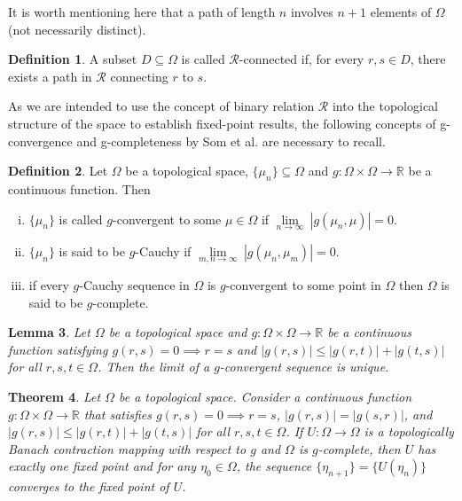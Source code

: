 \documentclass[10pt, reqno]{amsart}
\newtheorem{theorem}{Theorem}[section]
\newtheorem{lemma}[theorem]{Lemma}
\theoremstyle{definition}
\newtheorem{definition}[theorem]{Definition}
\theoremstyle{remark}
\numberwithin{equation}{section}
\begin{document}
It is worth mentioning here that a path of length $n$ involves $n+1$ elements of $ \Omega $ (not necessarily distinct). 

\begin{definition}\cite{alam0000relationfilomat} 
	A subset $D\subseteq \Omega $ is called $\mathcal{R}$-connected  if, for every $ r, s \in D $, there exists a path in $\mathcal{R}$  connecting $ r $ to $ s $. 
\end{definition}


As we are intended to  use the concept of binary relation $ \mathcal{R} $ into
the topological structure of the space to establish fixed-point results,   the following  concepts of g-convergence and g-completeness by Som et al. \cite{S.Som} are necessary to recall.

\begin{definition}\cite{S.Som}
     Let $ \Omega $ be a topological space,  $ \{ \mu_n\} \subseteq  \Omega $   and $ g : \Omega \times \Omega \to \mathbb{R} $ be a continuous function.   Then 
     \begin{enumerate} [(i)]
         \item $ \{ \mu_n\} $  is called $  g $-convergent to some  $ \mu \in \Omega $ if $ \underset{n\to \infty}{\lim} ~ | g ( \mu_n, \mu ) | = 0 $.
        \item $ \{\mu_n\} $  is said to be $  g $-Cauchy if $ \underset{m, n\to \infty}{\lim} ~ | g ( \mu_n, \mu_m ) | = 0 $.
        \item if every $  g $-Cauchy sequence   in  $ \Omega $  is $  g $-convergent to some  point  in  $ \Omega $ then $ \Omega $ is said to be $  g $-complete.
     \end{enumerate}
\end{definition}
 
\begin{lemma} \label{uniqueness of limit} \cite{S.Som}
	Let $ \Omega $ be a topological space and  $ g: \Omega \times \Omega \to\mathbb{R} $ be a continuous function     satisfying $ g ( r, s) = 0 \implies r = s $ and $ | g(r, s) | \leq | g(r, t) |+ | g(t, s) | $  for all $  r, s, t \in \Omega $.  Then the limit of a $ g $-convergent sequence is unique.
\end{lemma}

\begin{theorem} \cite{S.Som}  \label{thm of S.Som} 
Let $ \Omega $ be a  topological space. Consider a continuous function   $ g : \Omega \times \Omega \to \mathbb{R} $    that satisfies $ g(r, s) = 0 \implies r = s $, $ |g(r, s)| = |g( s, r )| $, and $ |g( r, s )| \leq |g(r, t )| + |g(t, s)| $ for all $ r, s, t \in \Omega $. If $ U : \Omega \to \Omega $ is a topologically Banach contraction mapping with respect to $ g $ and $ \Omega $ is $ g $-complete, then $ U $ has exactly one   fixed point and for any $ \eta_0 \in \Omega $, the sequence $ \{ \eta_{n+1} \} = \{ U(\eta_n) \}  $   converges to the  fixed point of $ U $.
\end{theorem}
\end{document}
